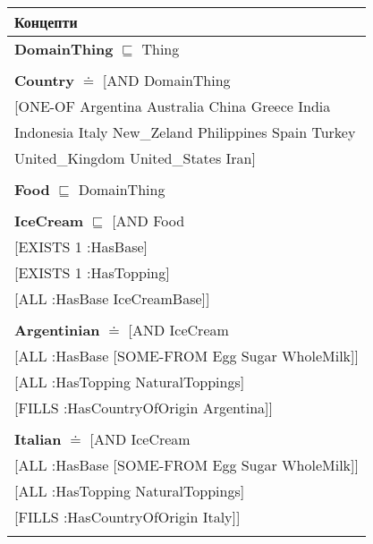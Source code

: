 \documentclass[12pt]{article}
\newcommand*{\MyIndent}{\hspace*{7em}}
\begin{document}
        \begin{tabularx}{1\textwidth}{@{}X@{}}
        \toprule
        \textbf{Концепти} \\
        \midrule
        \endhead

            \textbf{DomainThing} $\sqsubseteq$ Thing \\ \tabularnewline
        
            \textbf{Country} $\doteq$ [AND DomainThing \\
                            \MyIndent [ONE-OF Argentina Australia China Greece India \\
                                    \MyIndent Indonesia Italy New\_Zeland Philippines Spain Turkey \\
                                    \MyIndent United\_Kingdom United\_States Iran] \\
                            \tabularnewline

            \textbf{Food} $\sqsubseteq$ DomainThing \\ \tabularnewline


            
            \textbf{IceCream} $\sqsubseteq$ [AND Food \\
                                      \MyIndent [EXISTS 1 :HasBase] \\
                                      \MyIndent [EXISTS 1 :HasTopping] \\
                                      \MyIndent [ALL :HasBase IceCreamBase]] \\
                                      \tabularnewline
           
            \textbf{Argentinian} $\doteq$ [AND IceCream \\
                                            \MyIndent [ALL :HasBase [SOME-FROM Egg Sugar WholeMilk]] \\
                                              \MyIndent [ALL :HasTopping NaturalToppings] \\
                                              \MyIndent [FILLS :HasCountryOfOrigin Argentina]] \\
                                              \tabularnewline
           
            \textbf{Italian} $\doteq$ [AND IceCream \\
                                          \MyIndent [ALL :HasBase [SOME-FROM Egg Sugar WholeMilk]] \\
                                          \MyIndent [ALL :HasTopping NaturalToppings] \\
                                          \MyIndent [FILLS :HasCountryOfOrigin Italy]] \\
                                          \tabularnewline
            

\end{tabularx}
\end{document}
